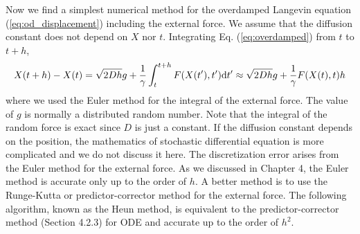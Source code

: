Now we find a simplest numerical method for the overdamped Langevin equation (\ref{eq:od_displacement}) including the external force.  We assume that the diffusion constant does not depend on $X$ nor $t$.  Integrating Eq. (\ref{eq:overdamped}) from $t$ to $t+h$, 
\begin{equation}
X(t+h)-X(t) = \sqrt{2Dh} g  + \frac{1}{\gamma} \int_t^{t+h} F(X(t'), t') \text{d} t'
\approx  \sqrt{2Dh} g + \frac{1}{\gamma}  F(X(t), t) h
\end{equation}
where we used the Euler method for the integral of the external force.  The value of $g$ is normally a distributed random number. Note that the integral of the random force is exact since $D$ is just a constant.
If the diffusion constant depends on the position, the mathematics of stochastic differential equation is more complicated \cite{langevin_eq_sekimoto} and we do not discuss it here.  The discretization error arises from the Euler method for the external force. As we discussed in Chapter 4, the Euler method is accurate only up to the order of $h$.  A better method is to use the Runge-Kutta or predictor-corrector method for the external force.  The following algorithm, known as the Heun method, is equivalent to the predictor-corrector method (Section 4.2.3) for ODE and accurate up to the order of $h^2$.

